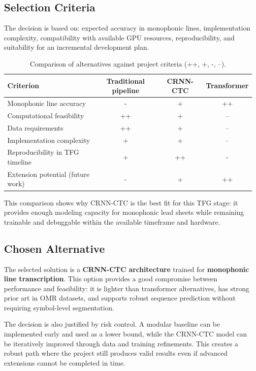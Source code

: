 \documentclass[11pt, a4paper]{article}
\begin{document}
\subsection{Selection Criteria}
The decision is based on: expected accuracy in monophonic lines, implementation complexity, compatibility with available GPU resources, reproducibility, and suitability for an incremental development plan.

\begin{table}[h!]
    \centering
    \caption{Comparison of alternatives against project criteria (++, +, -, --).}
    \label{tab:alt-comparison}
    \renewcommand{\arraystretch}{1.15}
    \begin{tabularx}{\linewidth}{>{\raggedright\arraybackslash}p{3.6cm} c c c}
        \toprule
        \textbf{Criterion} & \textbf{Traditional pipeline} & \textbf{CRNN-CTC} & \textbf{Transformer} \\
        \midrule
        Monophonic line accuracy         & -  & +  & ++ \\
        Computational feasibility        & ++ & +  & -- \\
        Data requirements                & ++ & +  & -- \\
        Implementation complexity        & +  & +  & -- \\
        Reproducibility in TFG timeline  & +  & ++ & -  \\
        Extension potential (future work)& -  & +  & ++ \\
        \bottomrule
    \end{tabularx}
\end{table}

This comparison shows why CRNN-CTC is the best fit for this TFG stage: it provides enough modeling capacity for monophonic lead sheets while remaining trainable and debuggable within the available timeframe and hardware.

\subsection{Chosen Alternative}
The selected solution is a \textbf{CRNN-CTC architecture} trained for \textbf{monophonic line transcription}. This option provides a good compromise between performance and feasibility: it is lighter than transformer alternatives, has strong prior art in OMR datasets, and supports robust sequence prediction without requiring symbol-level segmentation.

The decision is also justified by risk control. A modular baseline can be implemented early and used as a lower bound, while the CRNN-CTC model can be iteratively improved through data and training refinements. This creates a robust path where the project still produces valid results even if advanced extensions cannot be completed in time.
\end{document}
